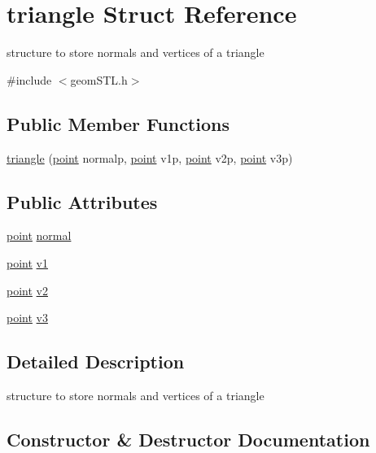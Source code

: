 \hypertarget{structtriangle}{}\section{triangle Struct Reference}
\label{structtriangle}


structure to store normals and vertices of a triangle  




{\ttfamily \#include $<$geom\+S\+T\+L.\+h$>$}

\subsection*{Public Member Functions}
\begin{DoxyCompactItemize}
\item 
\mbox{\hyperlink{structtriangle_a5e5e5b835f82bf53f2ba36e96600b273}{triangle}} (\mbox{\hyperlink{structpoint}{point}} normalp, \mbox{\hyperlink{structpoint}{point}} v1p, \mbox{\hyperlink{structpoint}{point}} v2p, \mbox{\hyperlink{structpoint}{point}} v3p)
\end{DoxyCompactItemize}
\subsection*{Public Attributes}
\begin{DoxyCompactItemize}
\item 
\mbox{\hyperlink{structpoint}{point}} \mbox{\hyperlink{structtriangle_a99c2fc091345b37cb9d068a7851243d1}{normal}}
\item 
\mbox{\hyperlink{structpoint}{point}} \mbox{\hyperlink{structtriangle_a1f178f3ffddf2f1ff8258007641bb2d8}{v1}}
\item 
\mbox{\hyperlink{structpoint}{point}} \mbox{\hyperlink{structtriangle_a95fa7738b13194d20216d0086c534fec}{v2}}
\item 
\mbox{\hyperlink{structpoint}{point}} \mbox{\hyperlink{structtriangle_ae5cd151c51a4de27c02f1a742f5171e7}{v3}}
\end{DoxyCompactItemize}


\subsection{Detailed Description}
structure to store normals and vertices of a triangle 

\subsection{Constructor \& Destructor Documentation}
\mbox{\label{structtriangle_a5e5e5b835f82bf53f2ba36e96600b273}} 
